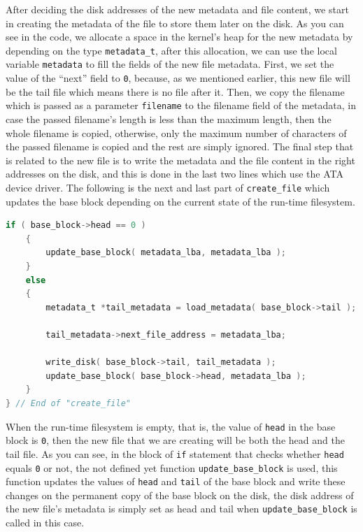 After deciding the disk addresses of the new metadata and file content,
we start in creating the metadata of the file to store them later on the
disk. As you can see in the code, we allocate a space in the kernel's
heap for the new metadata by depending on the type
\lstinline!metadata_t!, after this allocation, we can use the local
variable \lstinline!metadata! to fill the fields of the new file
metadata. First, we set the value of the ``next'' field to
\lstinline!0!, because, as we mentioned earlier, this new file will be
the tail file which means there is no file after it. Then, we copy the
filename which is passed as a parameter \lstinline!filename! to the
filename field of the metadata, in case the passed filename's length is
less than the maximum length, then the whole filename is copied,
otherwise, only the maximum number of characters of the passed filename
is copied and the rest are simply ignored. The final step that is
related to the new file is to write the metadata and the file content in
the right addresses on the disk, and this is done in the last two lines
which use the ATA device driver. The following is the next and last part
of \lstinline!create_file! which updates the base block depending on the
current state of the run-time filesystem.

\begin{lstlisting}[language=C]
    if ( base_block->head == 0 )
    {
        update_base_block( metadata_lba, metadata_lba );
    }
    else
    {   
        metadata_t *tail_metadata = load_metadata( base_block->tail );
        
        tail_metadata->next_file_address = metadata_lba;
        
        write_disk( base_block->tail, tail_metadata );      
        update_base_block( base_block->head, metadata_lba );
    }
} // End of "create_file"
\end{lstlisting}

When the run-time filesystem is empty, that is, the value of
\lstinline!head! in the base block is \lstinline!0!, then the new file
that we are creating will be both the head and the tail file. As you can
see, in the block of \lstinline!if! statement that checks whether
\lstinline!head! equals \lstinline!0! or not, the not defined yet
function \lstinline!update_base_block! is used, this function updates
the values of \lstinline!head! and \lstinline!tail! of the base block
and write these changes on the permanent copy of the base block on the
disk, the disk address of the new file's metadata is simply set as head
and tail when \lstinline!update_base_block! is called in this case.

